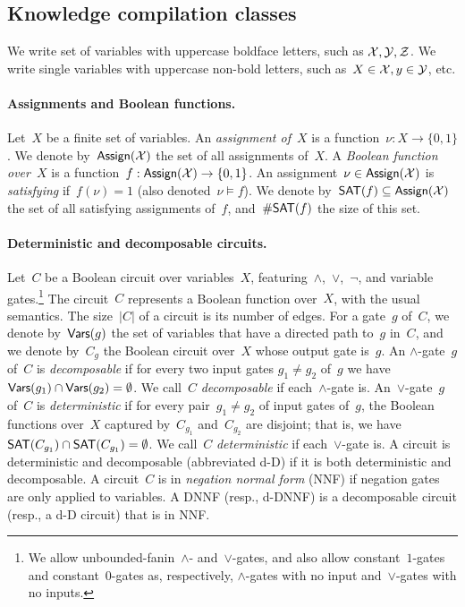\subsection{Knowledge compilation classes}
\label{subsec:KC}

We write set of variables with uppercase boldface letters, such as $\mathcal{X},\mathcal{Y},\mathcal{Z}$. We write single
variables with uppercase non-bold letters, such as~$X\in \mathcal{X}, y\in \mathcal{Y}$, etc.

\paragraph*{Assignments and Boolean functions.}
Let~$X$ be a finite set of variables.  An \emph{assignment of~$X$} is a
function~$\nu: X \to \{0,1\}$. We denote by~$\mathsf{Assign}(\mathcal{X})$ the set of all assignments
of~$X$.  A \emph{Boolean function over~$X$} is a function~$f:\mathsf{Assign}(\mathcal{X})\to \{0,1\}$.
An assignment~$\nu \in \mathsf{Assign}(\mathcal{X})$ is \emph{satisfying} if~$f(\nu) =1$ (also
denoted~$\nu \models f$).  We denote by~$\mathsf{SAT}(f)\subseteq \mathsf{Assign}(\mathcal{X})$ the set of all
satisfying assignments of~$f$, and~$\#\mathsf{SAT}(f)$ the size of this set.  

\paragraph*{Deterministic and decomposable circuits.}
Let~$C$ be a Boolean circuit over variables~$X$,
featuring~$\land$,~$\lor$,~$\lnot$, and variable gates.\footnote{We allow
unbounded-fanin~$\land$- and~$\lor$-gates, and also allow constant~$1$-gates
and constant~$0$-gates as, respectively, $\land$-gates with no input
and~$\lor$-gates with no inputs.} The circuit~$C$ represents a Boolean function
over~$X$, with the usual semantics.  The size~$|C|$ of a circuit is its number
of edges.  For a gate~$g$ of~$C$, we denote by~$\mathsf{Vars}(g)$ the set of variables
that have a directed path to~$g$ in~$C$, and we denote by~$C_g$ the Boolean
circuit over~$X$ whose output gate is~$g$.  An $\land$-gate~$g$ of~$C$ is
\emph{decomposable} if for every two input gates $g_1\neq g_2$ of~$g$ we
have~$\mathsf{Vars}(g_1) \cap \mathsf{Vars}(g_2) = \emptyset$.  We call~$C$ \emph{decomposable}
if each~$\land$-gate is.  An~$\lor$-gate~$g$ of~$C$ is \emph{deterministic} if
for every pair~$g_1\neq g_2$ of input gates of~$g$, the Boolean functions
over~$X$ captured by~$C_{g_1}$ and~$C_{g_2}$ are disjoint; that is, we
have~$\mathsf{SAT}(C_{g_1}) \cap \mathsf{SAT}(C_{g_1}) = \emptyset$.  We call~$C$
\emph{deterministic} if each~$\lor$-gate is.  A circuit is deterministic and
decomposable (abbreviated d-D) if it is both deterministic and decomposable.  A
circuit~$C$ is in \emph{negation normal form} (NNF) if negation gates are only
applied to variables.  A DNNF (resp., d-DNNF) is a decomposable circuit (resp.,
a d-D circuit) that is in NNF.


